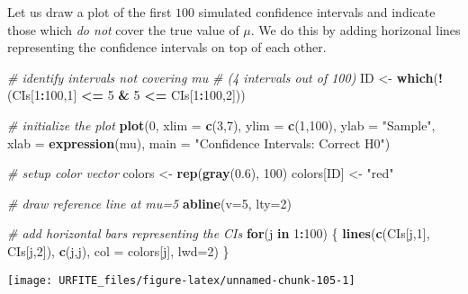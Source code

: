 \documentclass[]{book}
\newenvironment{Shaded}{\begin{snugshade}}{\end{snugshade}}
\newcommand{\KeywordTok}[1]{\textcolor[rgb]{0.13,0.29,0.53}{\textbf{#1}}}
\newcommand{\DataTypeTok}[1]{\textcolor[rgb]{0.13,0.29,0.53}{#1}}
\newcommand{\DecValTok}[1]{\textcolor[rgb]{0.00,0.00,0.81}{#1}}
\newcommand{\FloatTok}[1]{\textcolor[rgb]{0.00,0.00,0.81}{#1}}
\newcommand{\StringTok}[1]{\textcolor[rgb]{0.31,0.60,0.02}{#1}}
\newcommand{\CommentTok}[1]{\textcolor[rgb]{0.56,0.35,0.01}{\textit{#1}}}
\newcommand{\ControlFlowTok}[1]{\textcolor[rgb]{0.13,0.29,0.53}{\textbf{#1}}}
\newcommand{\OperatorTok}[1]{\textcolor[rgb]{0.81,0.36,0.00}{\textbf{#1}}}
\newcommand{\NormalTok}[1]{#1}
\theoremstyle{definition}
\theoremstyle{definition}
\theoremstyle{definition}
\theoremstyle{remark}
\begin{document}
Let us draw a plot of the first \(100\) simulated confidence intervals
and indicate those which \emph{do not} cover the true value of \(\mu\).
We do this by adding horizonal lines representing the confidence
intervals on top of each other.

\begin{Shaded}
\begin{Highlighting}[]
\CommentTok{# identify intervals not covering mu}
\CommentTok{# (4 intervals out of 100)}
\NormalTok{ID <-}\StringTok{ }\KeywordTok{which}\NormalTok{(}\OperatorTok{!}\NormalTok{(CIs[}\DecValTok{1}\OperatorTok{:}\DecValTok{100}\NormalTok{,}\DecValTok{1}\NormalTok{] }\OperatorTok{<=}\StringTok{ }\DecValTok{5} \OperatorTok{&}\StringTok{ }\DecValTok{5} \OperatorTok{<=}\StringTok{ }\NormalTok{CIs[}\DecValTok{1}\OperatorTok{:}\DecValTok{100}\NormalTok{,}\DecValTok{2}\NormalTok{]))}

\CommentTok{# initialize the plot}
\KeywordTok{plot}\NormalTok{(}\DecValTok{0}\NormalTok{, }
     \DataTypeTok{xlim =} \KeywordTok{c}\NormalTok{(}\DecValTok{3}\NormalTok{,}\DecValTok{7}\NormalTok{), }
     \DataTypeTok{ylim =} \KeywordTok{c}\NormalTok{(}\DecValTok{1}\NormalTok{,}\DecValTok{100}\NormalTok{), }
     \DataTypeTok{ylab =} \StringTok{"Sample"}\NormalTok{, }
     \DataTypeTok{xlab =} \KeywordTok{expression}\NormalTok{(mu), }
     \DataTypeTok{main =} \StringTok{"Confidence Intervals: Correct H0"}\NormalTok{)}

\CommentTok{# setup color vector}
\NormalTok{colors <-}\StringTok{ }\KeywordTok{rep}\NormalTok{(}\KeywordTok{gray}\NormalTok{(}\FloatTok{0.6}\NormalTok{), }\DecValTok{100}\NormalTok{)}
\NormalTok{colors[ID] <-}\StringTok{ "red"}

\CommentTok{# draw reference line at mu=5}
\KeywordTok{abline}\NormalTok{(}\DataTypeTok{v=}\DecValTok{5}\NormalTok{, }\DataTypeTok{lty=}\DecValTok{2}\NormalTok{)}

\CommentTok{# add horizontal bars representing the CIs}
\ControlFlowTok{for}\NormalTok{(j }\ControlFlowTok{in} \DecValTok{1}\OperatorTok{:}\DecValTok{100}\NormalTok{) \{}
  \KeywordTok{lines}\NormalTok{(}\KeywordTok{c}\NormalTok{(CIs[j,}\DecValTok{1}\NormalTok{], CIs[j,}\DecValTok{2}\NormalTok{]), }
        \KeywordTok{c}\NormalTok{(j,j), }
        \DataTypeTok{col =}\NormalTok{ colors[j], }
        \DataTypeTok{lwd=}\DecValTok{2}\NormalTok{)}
\NormalTok{\}}
\end{Highlighting}
\end{Shaded}

\begin{center}\texttt{[image: URFITE\_files/figure-latex/unnamed-chunk-105-1]} \end{center}
\end{document}
